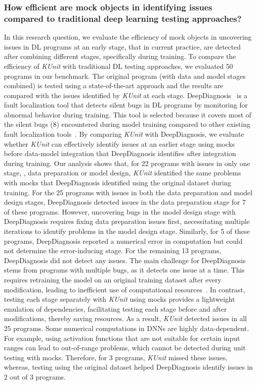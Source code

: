 \subsubsection{How efficient are mock objects in identifying issues compared to traditional deep learning testing approaches?}
In this research question, we evaluate the efficiency of mock objects in uncovering issues in DL programs at an early stage, that in current practice, are detected after combining different stages, specifically during training.
To compare the efficiency of {\em KUnit} with traditional DL testing approaches, we evaluated 50 programs in our benchmark.
The original program (with data and model stages combined) is tested using a state-of-the-art approach \cite{wardat22DeepDiagnosis} and the results are compared with the issues identified by {\em KUnit} at each stage.
DeepDiagnosis~\cite{wardat22DeepDiagnosis} is a fault localization tool that detects silent bugs in DL programs by monitoring for abnormal behavior during training.
This tool is selected because it covers most of the silent bugs (8) encountered during model training compared to other existing fault localization tools~\cite{schoop2021umlaut,wardat21DeepLocalize,Zhang21Autotrainer,cao2022deepfd}.
By comparing {\em KUnit} with DeepDiagnosis, we evaluate whether {\em KUnit} can effectively identify issues at an earlier stage using mocks before data-model integration that DeepDiagnosis identifies after integration during training.
Our analysis shows that, 
for 22 programs with issues in only one stage, \ie, data preparation or model design, {\em KUnit} identified the same problems with mocks that DeepDiagnosis identified using the original dataset during training. 
For the 25 programs with issues in both the data preparation and model design stages, DeepDiagnosis detected issues in the data preparation stage for 7 of these programs. 
However, uncovering bugs in the model design stage with DeepDiagnosis requires fixing data preparation issues first, necessitating multiple iterations to identify problems in the model design stage. 
Similarly, for 5 of these programs, DeepDiagnosis reported a numerical error in computation but could not determine the error-inducing stage. 
For the remaining 13 programs, DeepDiagnosis did not detect any issues.
The main challenge for DeepDiagnosis stems from programs with multiple bugs, as it detects one issue at a time.
This requires retraining the model on an original training dataset after every modification, leading to inefficient use of computational resources~\cite{Zhang21Autotrainer}.
In contrast, testing each stage separately with {\em KUnit} using mocks provides a lightweight emulation of dependencies, facilitating testing each stage before and after modifications, thereby saving resources.
As a result, {\em KUnit} detected issues in all 25 programs.
Some numerical computations in DNNs are highly data-dependent.
For example, using activation functions that are not suitable for certain input ranges can lead to out-of-range problems, which cannot be detected during unit testing with mocks.
Therefore, for 3 programs, {\em KUnit} missed these issues, whereas, testing using the original dataset helped DeepDiagnosis identify issues in 2 out of 3 programs. 

